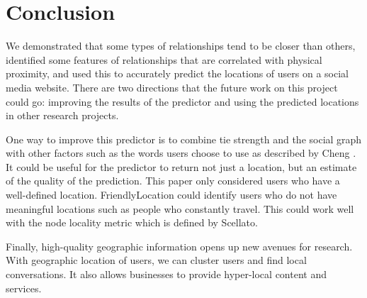 \documentclass[letterpaper]{article}
\begin{document}
\section{Conclusion}

We demonstrated that some types of relationships tend to be closer than others,
identified some features of relationships that are correlated with physical
proximity, and used this to accurately predict the locations of users on a
social media website.
%
There are two directions that the future work on this project could go:
improving the results of the predictor and using the predicted locations in
other research projects.

One way to improve this predictor is to combine tie strength and the social
graph with other factors such as the words users choose to use as described by
Cheng \cite{cheng2010you}.
%
It could be useful for the predictor to return not just a location, but an
estimate of the quality of the prediction.
%
This paper only considered users who have a well-defined location.
%
FriendlyLocation could identify users who do not have meaningful locations such
as people who constantly travel.
%
This could work well with the node locality metric which is defined by
Scellato\cite{scellato2010distance}.

Finally, high-quality geographic information opens up new avenues for research.
With geographic location of users, we can cluster users and find local
conversations.
%
It also allows businesses to provide hyper-local content and services.

\fontsize{9pt}{10pt}


\end{document}
